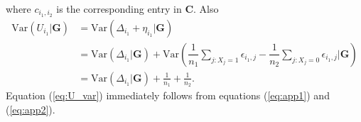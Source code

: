 \documentclass[a4,center,fleqn]{NAR}
\newcommand{\var}{\text{Var}}
\begin{document}
	where $c_{i_1,i_2}$ is the corresponding entry in $\bm C$. Also 
	\begin{equation}\label{eq:app2}
		\begin{aligned}
			\var(U_{i_1}|\bm G) &= \var(\Delta_{i_1} + \eta_{i_1} |\bm G) \\
			& = \var(\Delta_{i_1}|\bm G) + \var(\dfrac{1}{n_1}\sum_{j: X_j=1}\epsilon_{i_1,j}-
			\dfrac{1}{n_2}\sum_{j: X_j=0}\epsilon_{i_1,j}|\bm G)\\
			& =\text{Var}(\Delta_{i_1}|\bm G) + \frac{1}{n_1} + \frac{1}{n_2}. 
		\end{aligned}
	\end{equation}
	Equation (\ref{eq:U_var}) immediately follows from equations (\ref{eq:app1}) and 
	(\ref{eq:app2}).	

	
	\newpage
	
	
	
	
	

	
	
\end{document}
